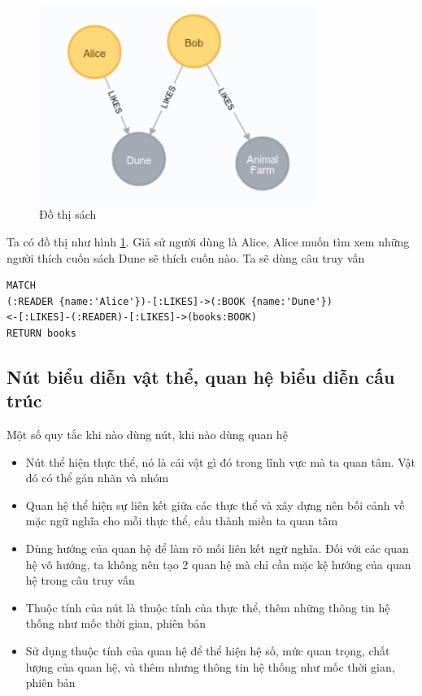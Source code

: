 \begin{figure}[h]
\centering
\includegraphics[width=0.8\textwidth]{image/bookfull.png}
\caption{\label{fig:graphbook} Đồ thị sách}
\end{figure}

Ta có đồ thị như hình \ref{fig:graphbook}. Giả sử người dùng là Alice, Alice muốn tìm xem những người thích cuốn sách Dune sẽ thích cuốn nào. Ta sẽ dùng câu truy vấn 

\begin{lstlisting}[caption={Cypher tìm người thích đọc sách tên Dune}, label={lst:cypherdune}]
MATCH 
(:READER {name:'Alice'})-[:LIKES]->(:BOOK {name:'Dune'})
<-[:LIKES]-(:READER)-[:LIKES]->(books:BOOK) 
RETURN books
\end{lstlisting}

\subsection{Nút biểu diễn vật thể, quan hệ biểu diễn cấu trúc}

Một số quy tắc khi nào dùng nút, khi nào dùng quan hệ

\begin{itemize}
\item Nút thể hiện thực thể, nó là cái vật gì đó trong lĩnh vực mà ta quan tâm. Vật đó có thể gán nhãn và nhóm 
\item Quan hệ thể hiện sự liên kết giữa các thực thể và xây dựng nên bối cảnh về mặc ngữ nghĩa cho mỗi thực thể, cấu thành miền ta quan tâm
\item Dùng hướng của quan hệ để làm rõ mối liên kết ngữ nghĩa. Đối với các quan hệ vô hướng, ta không nên tạo 2 quan hệ mà chỉ cần mặc kệ hướng của quan hệ trong câu truy vấn 
\item Thuộc tính của nút là thuộc tính của thực thể, thêm những thông tin hệ thống như mốc thời gian, phiên bản 
\item Sử dụng thuộc tính của quan hệ để thể hiện hệ số, mức quan trọng, chất lượng của quan hệ, và thêm nhưng thông tin hệ thống như mốc thời gian, phiên bản 
\end{itemize}


